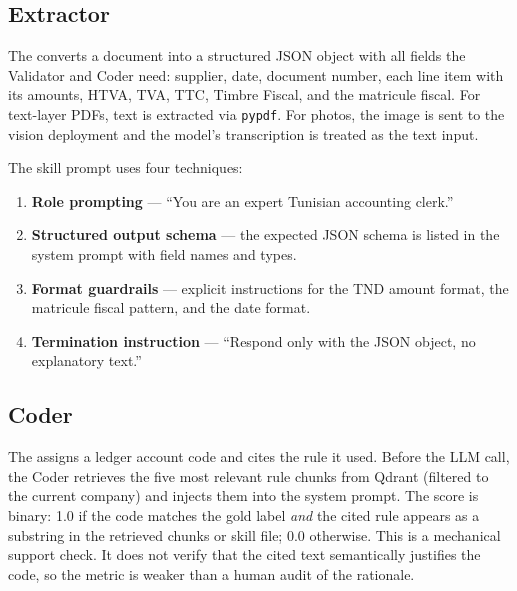 \subsection{Extractor}

The  converts a document into a structured JSON object with all
fields the Validator and Coder need: supplier, date, document number, each line item
with its amounts, HTVA, TVA, TTC, Timbre Fiscal, and the matricule fiscal.
For text-layer PDFs, text is extracted via \texttt{pypdf}. For photos, the image
is sent to the vision deployment and the model's transcription is treated as the
text input.

The skill prompt uses four techniques:
\begin{enumerate}[leftmargin=*, itemsep=1pt]
  \item \textbf{Role prompting} — ``You are an expert Tunisian accounting clerk.''
  \item \textbf{Structured output schema} — the expected JSON schema is listed
        in the system prompt with field names and types.
  \item \textbf{Format guardrails} — explicit instructions for the TND amount
        format, the matricule fiscal pattern, and the date format.
  \item \textbf{Termination instruction} — ``Respond only with the JSON object,
        no explanatory text.''
\end{enumerate}

\subsection{Coder}

The  assigns a ledger account code and cites the rule it used. Before
the LLM call, the Coder retrieves the five most relevant rule chunks from Qdrant
(filtered to the current company) and injects them into the system prompt. The
score is binary: 1.0 if the code matches the gold label \emph{and} the cited rule
appears as a substring in the retrieved chunks or skill file; 0.0 otherwise. This
is a mechanical support check. It does not verify that the cited text semantically
justifies the code, so the metric is weaker than a human audit of the rationale.

